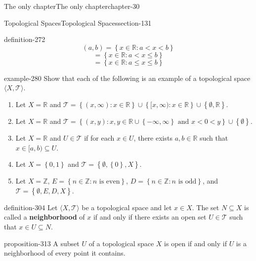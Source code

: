 \documentclass[oneside,10pt,]{book}
\newcommand{\terminology}[1]{\textbf{#1}}
\newcommand{\tuple}[1]{\langle #1 \rangle}
\newcommand{\mb}{\mathbb}
\newcommand{\mc}{\mathcal}
\newcommand{\setBuilder}[2]{\left\{#1:#2\right\}}
\newcommand{\setList}[1]{\left\{#1\right\}}
\newcommand{\lt}{<}
\begin{document}
\begin{chapterptx}{The only chapter}{}{The only chapter}{}{}{chapter-30}
\begin{sectionptx}{Topological Spaces}{}{Topological Spaces}{}{}{section-131}
\begin{definition}{}{definition-272}
%
\begin{equation*}
(a,b)=\setBuilder{x\in\mb R}{a\lt x\lt b}
\end{equation*}
%
\begin{equation*}
[a,b)=\setBuilder{x\in\mb R}{a\leq x\lt b}
\end{equation*}
%
\begin{equation*}
(a,b]=\setBuilder{x\in\mb R}{a\lt x\leq b}
\end{equation*}
%
\begin{equation*}
[a,b]=\setBuilder{x\in\mb R}{a\leq x\leq b}
\end{equation*}
\end{definition}
\begin{example}{}{example-280}%
\hypertarget{p-281}{}%
Show that each of the following is an example of a topological space \(\tuple{X,\mc T}\).%
\leavevmode%
\begin{enumerate}
\item\hypertarget{li-284}{}Let \(X=\mb R\) and \(\mc T=\setBuilder{(x,\infty)}{x\in\mb R}
\cup\setBuilder{[x,\infty)}{x\in\mb R}\cup\setList{\emptyset,\mb R}\).%
\item\hypertarget{li-287}{}Let \(X=\mb R\) and \(\mc T=\setBuilder{(x,y)}{
x,y\in\mb R\cup\setList{-\infty,\infty} \text{ and }x\lt 0\lt y
}\cup\setList{\emptyset}\).%
\item\hypertarget{li-290}{}Let \(X=\mb R\) and \(U\in\mc T\) if for each \(x\in U\), there exists \(a,b\in\mb R\) such that \(x\in[a,b)\subseteq U\).%
\item\hypertarget{li-296}{}Let \(X=\setList{0,1}\) and \(\mc T=\setList{\emptyset,\setList{0},X}\).%
\item\hypertarget{li-299}{}Let \(X=\mb Z\), \(E=\setBuilder{n\in\mb Z}{n\text{ is even}}\), \(D=\setBuilder{n\in\mb Z}{n\text{ is odd}}\), and \(\mc T=\setList{\emptyset,E,D,X}\).%
\end{enumerate}
\end{example}
\begin{definition}{}{definition-304}%
\hypertarget{p-305}{}%
Let \(\tuple{X,\mc T}\) be a topological space and let \(x\in X\). The set \(N\subseteq X\) is called a \terminology{neighborhood} of \(x\) if and only if there exists an open set \(U\in\mc T\) such that \(x\in U\subseteq N\).%
\end{definition}
\begin{proposition}{}{}{proposition-313}%
\hypertarget{p-314}{}%
A subset \(U\) of a topological space \(X\) is open if and only if \(U\) is a neighborhood of every point it contains.%

\end{proposition}
\end{sectionptx}
\end{chapterptx}
\end{document}
